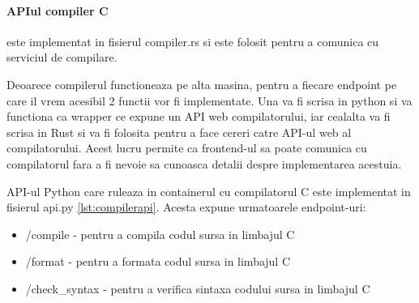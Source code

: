 \documentclass[titlepage,12pt]{article}
\DeclareRobustCommand{\code}[1]{{\ttfamily\small #1}}
\begin{document}
\paragraph{API\-ul compiler C} este implementat in fisierul \code{compiler.rs} si este folosit pentru a comunica cu serviciul de compilare.

Deoarece compilerul functioneaza pe alta masina, pentru a fiecare endpoint pe care il vrem acesibil 2 functii vor fi implementate. Una va fi scrisa in python si va functiona ca wrapper ce expune un API web compilatorului, iar cealalta va fi scrisa in Rust si va fi folosita pentru a face cereri catre API-ul web al compilatorului. Acest lucru permite ca frontend-ul sa poate comunica cu compilatorul fara a fi nevoie sa cunoasca detalii despre implementarea acestuia.

API-ul Python care ruleaza in containerul cu compilatorul C este implementat in fisierul \code{api.py} \cref{lst:compilerapi}. Acesta expune urmatoarele endpoint-uri:
\begin{itemize}
\item \code{/compile} - pentru a compila codul sursa in limbajul C
\item \code{/format} - pentru a formata codul sursa in limbajul C
\item \code{/check\_syntax} - pentru a verifica sintaxa codului sursa in limbajul C
\end{itemize}
\end{document}
